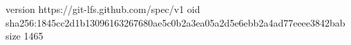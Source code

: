 version https://git-lfs.github.com/spec/v1
oid sha256:1845cc2d1b13096163267680ae5c0b2a3ea05a2d5e6ebb2a4ad77eeee3842bab
size 1465
